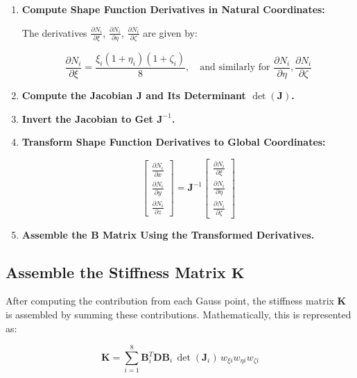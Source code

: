 \documentclass{article}
\begin{document}
\begin{enumerate}
    \item \textbf{Compute Shape Function Derivatives in Natural Coordinates:}
    
    The derivatives $ \frac{\partial N_i}{\partial \xi} $, $ \frac{\partial N_i}{\partial \eta} $, $ \frac{\partial N_i}{\partial \zeta} $ are given by:
    
    $$
    \frac{\partial N_i}{\partial \xi} = \frac{\xi_i (1 + \eta_i)(1 +  \zeta_i)}{8}, \quad \text{and similarly for } \frac{\partial N_i}{\partial \eta}, \frac{\partial N_i}{\partial \zeta}
    $$
    
    \item \textbf{Compute the Jacobian $ \mathbf{J} $ and Its Determinant $ \det(\mathbf{J}) $.}
    
    \item \textbf{Invert the Jacobian to Get $ \mathbf{J}^{-1} $.}
    
    \item \textbf{Transform Shape Function Derivatives to Global Coordinates:}
    
    $$
    \begin{bmatrix}
    \frac{\partial N_i}{\partial x} \\
    \frac{\partial N_i}{\partial y} \\
    \frac{\partial N_i}{\partial z} 
    \end{bmatrix}
    = \mathbf{J}^{-1}
    \begin{bmatrix}
    \frac{\partial N_i}{\partial \xi} \\
    \frac{\partial N_i}{\partial \eta} \\
    \frac{\partial N_i}{\partial \zeta} 
    \end{bmatrix}
    $$
    
    \item \textbf{Assemble the $ \mathbf{B} $ Matrix Using the Transformed Derivatives.}
\end{enumerate}

\subsection{Assemble the Stiffness Matrix $ \mathbf{K} $}

After computing the contribution from each Gauss point, the stiffness matrix $ \mathbf{K} $ is assembled by summing these contributions. Mathematically, this is represented as:

$$
\mathbf{K} = \sum_{i=1}^{8} \mathbf{B}_i^T \mathbf{D} \mathbf{B}_i \, \det(\mathbf{J}_i) \, w_{\xi i} w_{\eta i} w_{\zeta i}
$$
\end{document}
